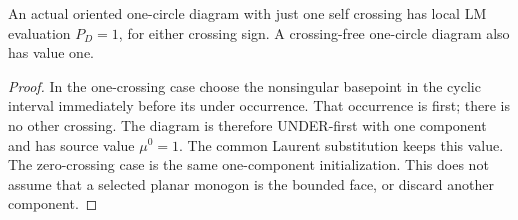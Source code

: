 \begin{lemma}
\label{lc:single-crossing}\leanok
An actual oriented one-circle diagram with just one self crossing has
local LM evaluation $P_D=1$, for either crossing sign. A crossing-free
one-circle diagram also has value one.

\end{lemma}
\begin{proof}\leanok
In the one-crossing case choose the nonsingular basepoint in the cyclic
interval immediately before its under occurrence. That occurrence is
first; there is no other crossing. The diagram is therefore UNDER-first
with one component and has source value $\mu^0=1$. The common Laurent
substitution keeps this value. The zero-crossing case is the same
one-component initialization. This does not assume that a selected
planar monogon is the bounded face, or discard another component.
\end{proof}

